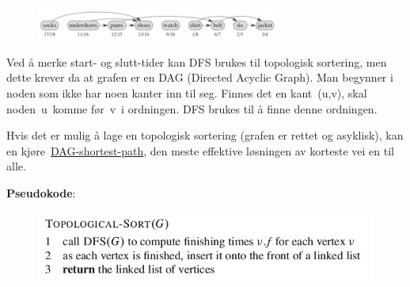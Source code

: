 \documentclass[12pt]{report}
\begin{document}
\vspace{\baselineskip}

\vspace{\baselineskip}



\begin{figure}[H]
\advance\leftskip 3.22in		\includegraphics[width=3.14in,height=0.44in]{./media/image103.png}
\end{figure}



\par

 \par


\vspace{\baselineskip}

\vspace{\baselineskip}

\vspace{\baselineskip}
Ved å merke start- og slutt-tider kan DFS brukes til topologisk sortering, men dette krever da at grafen er en DAG (Directed Acyclic Graph). Man begynner i noden som ikke har noen kanter inn til seg. Finnes det en kant (u,v), skal noden u komme før v i ordningen. DFS brukes til å finne denne ordningen.\par

Hvis det er mulig å lage en topologisk sortering (grafen er rettet og asyklisk), kan en kjøre \href{https://www.wikipendium.no/TDT4120_Algoritmer_og_datastrukturer/nb/}{\textcolor[HTML]{006699}{DAG-shortest-path}}, den meste effektive løsningen av korteste vei en til alle.\par


\vspace{\baselineskip}
{\fontsize{13pt}{15.6pt}\selectfont \textbf{Pseudokode}:\par}\par




\begin{figure}[H]
	\begin{Center}
		\includegraphics[width=4.62in,height=0.92in]{./media/image104.png}
	\end{Center}
\end{figure}
\end{document}
